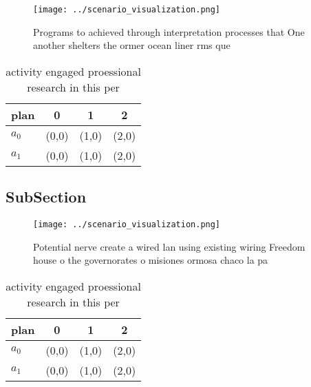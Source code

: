 \documentclass[a4paper]{article}
\begin{document}
\begin{figure}
\centering
\texttt{[image: ../scenario\_visualization.png]}
\caption{Programs to achieved through interpretation processes that One another shelters the ormer ocean liner rms que
}
\end{figure}
 
\begin{table}
\begin{adjustbox}{width=0.6\columnwidth}
\begin{tabular}{|l|l|l|l|}
\hline
\textbf{plan} & \multicolumn{1}{c|}{\textbf{0}} & \multicolumn{1}{c|}{\textbf{1}} & \multicolumn{1}{c|}{\textbf{2}} \\ \hline
\textbf{$a_0$}  & (0,0) & (1,0) & (2,0) \\ \hline
\textbf{$a_1$}  & (0,0) & (1,0) & (2,0) \\ \hline
\end{tabular}
\end{adjustbox}
\caption{activity engaged proessional research in this per
}
\end{table}

\subsection{SubSection}

\begin{figure}
\centering
\texttt{[image: ../scenario\_visualization.png]}
\caption{Potential nerve create a wired lan using existing wiring Freedom house o the governorates o misiones ormosa chaco la pa
}
\end{figure}
 
\begin{table}
\begin{adjustbox}{width=0.6\columnwidth}
\begin{tabular}{|l|l|l|l|}
\hline
\textbf{plan} & \multicolumn{1}{c|}{\textbf{0}} & \multicolumn{1}{c|}{\textbf{1}} & \multicolumn{1}{c|}{\textbf{2}} \\ \hline
\textbf{$a_0$}  & (0,0) & (1,0) & (2,0) \\ \hline
\textbf{$a_1$}  & (0,0) & (1,0) & (2,0) \\ \hline
\end{tabular}
\end{adjustbox}
\caption{activity engaged proessional research in this per
}
\end{table}
\end{document}
